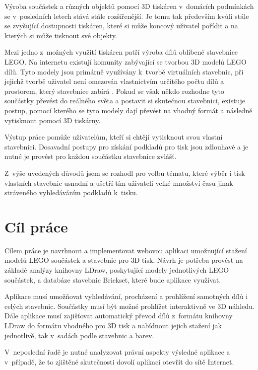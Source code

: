 \label{introduction}
Výroba součástek a různých objektů pomocí 3D tiskáren v~domácích podmínkách se v~posledních letech stává stále rozšířenější. Je tomu tak především kvůli stále se zvyšující dostupnosti tiskáren, které si může koncový uživatel pořídit a na kterých si může tisknout své objekty. 

Mezi jedno z~možných využití tiskáren patří výroba dílů oblíbené stavebnice LEGO. Na internetu existují komunity zabývající se tvorbou 3D modelů LEGO dílů. Tyto modely jsou primárně využívány k~tvorbě virtuálních stavebnic, při jejichž tvorbě uživatel není omezován vlastnictvím určitého počtu dílů a prostorem, který stavebnice zabírá \autocite{ldraw:homepage}. Pokud se však někdo rozhodne tyto součástky převést do reálného světa a postavit si skutečnou stavebnici, existuje postup, pomocí kterého se tyto modely dají převést na vhodný formát a následně vytisknout pomocí 3D tiskárny.

Výstup práce pomůže uživatelům, kteří si chtějí vytisknout svou vlastní stavebnici. Dosavadní postupy pro získání podkladů pro tisk jsou zdlouhavé a je nutné je provést pro každou součástku stavebnice zvlášť.

Z~výše uvedených důvodů jsem se rozhodl pro volbu tématu, které výběr i tisk vlastních stavebnic usnadní a ušetří tím uživateli velké množství času jinak stráveného vyhledáváním podkladů k~tisku. 

\section*{Cíl práce}
Cílem práce je navrhnout a implementovat webovou aplikaci umožnující stažení modelů LEGO součástek a stavebnic pro 3D tisk. Návrh je potřeba provést na základě analýzy knihovny LDraw, poskytující modely jednotlivých LEGO součástek, a databáze stavebnic Brickset, které bude aplikace využívat.

Aplikace musí umožňovat vyhledávání, procházení a prohlížení samotných dílů i celých stavebnic. Součástky musí být možné prohlížet interaktivně ve 3D náhledu. Dále aplikace musí zajišťovat automatický převod dílů z~formátu knihovny LDraw do formátu vhodného pro 3D tisk a nabídnout jejich stažení jak jednotlivě, tak v~sadách podle stavebnic a barev. 

V~neposlední řadě je nutné analyzovat právní aspekty výsledné aplikace a v~případě, že to zjištěné skutečnosti dovolí aplikaci otevřít do sítě Internet.
